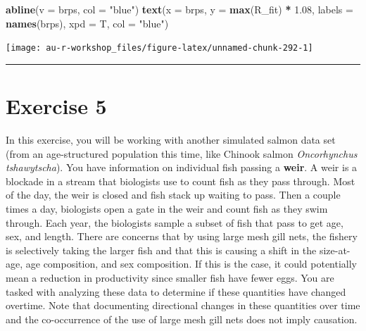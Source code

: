 \documentclass[]{book}
\newenvironment{Shaded}{\begin{snugshade}}{\end{snugshade}}
\newcommand{\DataTypeTok}[1]{\textcolor[rgb]{0.13,0.29,0.53}{#1}}
\newcommand{\FloatTok}[1]{\textcolor[rgb]{0.00,0.00,0.81}{#1}}
\newcommand{\KeywordTok}[1]{\textcolor[rgb]{0.13,0.29,0.53}{\textbf{#1}}}
\newcommand{\NormalTok}[1]{#1}
\newcommand{\OperatorTok}[1]{\textcolor[rgb]{0.81,0.36,0.00}{\textbf{#1}}}
\newcommand{\StringTok}[1]{\textcolor[rgb]{0.31,0.60,0.02}{#1}}
\begin{document}
\begin{Shaded}
\begin{Highlighting}[]
\KeywordTok{abline}\NormalTok{(}\DataTypeTok{v =}\NormalTok{ brps, }\DataTypeTok{col =} \StringTok{"blue"}\NormalTok{)}
\KeywordTok{text}\NormalTok{(}\DataTypeTok{x =}\NormalTok{ brps, }\DataTypeTok{y =} \KeywordTok{max}\NormalTok{(R_fit) }\OperatorTok{*}\StringTok{ }\FloatTok{1.08}\NormalTok{, }
     \DataTypeTok{labels =} \KeywordTok{names}\NormalTok{(brps), }\DataTypeTok{xpd =}\NormalTok{ T, }\DataTypeTok{col =} \StringTok{"blue"}\NormalTok{)}
\end{Highlighting}
\end{Shaded}

\begin{center}\texttt{[image: au-r-workshop\_files/figure-latex/unnamed-chunk-292-1]} \end{center}

\begin{center}\rule{0.5\linewidth}{\linethickness}\end{center}

\hypertarget{exercise-5}{%
\section*{Exercise 5}\label{exercise-5}}

In this exercise, you will be working with another simulated salmon data set (from an age-structured population this time, like Chinook salmon \emph{Oncorhynchus tshawytscha}). You have information on individual fish passing a \textbf{weir}. A weir is a blockade in a stream that biologists use to count fish as they pass through. Most of the day, the weir is closed and fish stack up waiting to pass. Then a couple times a day, biologists open a gate in the weir and count fish as they swim through. Each year, the biologists sample a subset of fish that pass to get age, sex, and length. There are concerns that by using large mesh gill nets, the fishery is selectively taking the larger fish and that this is causing a shift in the size-at-age, age composition, and sex composition. If this is the case, it could potentially mean a reduction in productivity since smaller fish have fewer eggs. You are tasked with analyzing these data to determine if these quantities have changed overtime. Note that documenting directional changes in these quantities over time and the co-occurrence of the use of large mesh gill nets does not imply causation.
\end{document}
